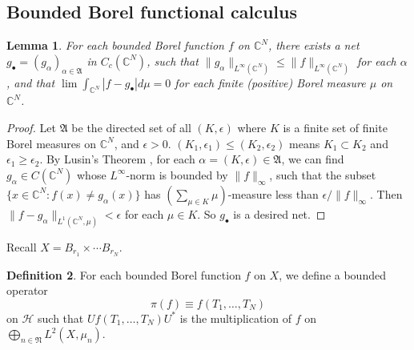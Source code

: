 \documentclass[12pt,a4paper,notitlepage]{article}
\theoremstyle{definition}
\newtheorem{df}{Definition}[section]
\theoremstyle{plain}
\newtheorem{lm}[df]{Lemma}
\newcommand{\fk}{\mathfrak}
\newcommand{\mc}{\mathcal}
\newcommand{\blt}{\bullet}
\newcommand{\Cbb}{\mathbb C}
\numberwithin{equation}{section}
\begin{document}

\subsection*{Bounded Borel functional calculus}


\begin{lm}\label{lb18}
For each bounded Borel function $f$ on $\Cbb^N$, there exists a net $g_\blt=(g_\alpha)_{\alpha\in\fk A}$ in $C_c(\Cbb^N)$, such that $\lVert g_\alpha\lVert_{L^\infty(\Cbb^N)}\leq \lVert f\lVert_{L^\infty(\Cbb^N)}$ for each $\alpha$, and that $\lim \int_{\Cbb^N}|f-g_\blt|d\mu=0$ for each finite (positive) Borel measure $\mu$ on $\Cbb^N$.
\end{lm}

\begin{proof}
Let $\fk A$ be the directed set of all $(K,\epsilon)$ where $K$ is a finite set of finite Borel measures on $\Cbb^N$, and $\epsilon>0$.  $(K_1,\epsilon_1)\leq (K_2,\epsilon_2)$ means $K_1\subset K_2$ and $\epsilon_1\geq\epsilon_2$. By Lusin's Theorem \cite[Thm. 2.24]{Rud-R}, for each $\alpha=(K,\epsilon)\in\fk A$, we can find $g_\alpha\in C(\Cbb^N)$ whose $L^\infty$-norm is bounded by $\lVert f\lVert_\infty$, such that the subset $\{x\in \Cbb^N:f(x)\neq g_\alpha(x)\}$ has $(\sum_{\mu\in K}\mu)$-measure less than $\epsilon/\lVert f\lVert_\infty$.  Then $\lVert f-g_\alpha\lVert_{L^1(\Cbb^N,\mu)}<\epsilon$ for each $\mu\in K$. So $g_\blt$ is a desired net.
\end{proof}



Recall $X=B_{r_1}\times\cdots B_{r_N}$.

\begin{df}\label{lb58}
For each bounded Borel function $f$ on $X$, we define a bounded operator $$\pi(f)\equiv f(T_1,\dots,T_N)$$ on $\mc H$ such that $Uf(T_1,\dots,T_N)U^*$ is the multiplication of $f$ on $\bigoplus_{n\in\fk N} L^2(X,\mu_n)$. 
\end{df}
\end{document}
